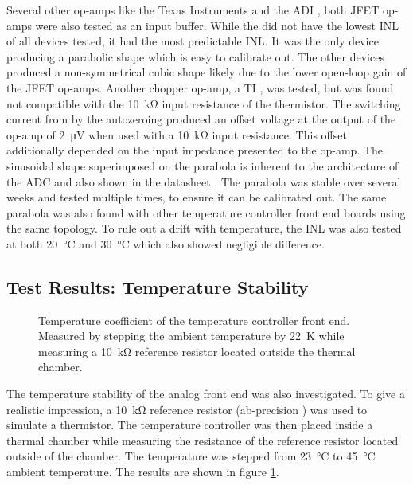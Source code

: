 Several other op-amps like the Texas Instruments  and the ADI , both JFET op-amps were also tested as an input buffer. While the  did not have the lowest INL of all devices tested, it had the most predictable INL. It was the only device producing a parabolic shape \cite{thesis_sattelmaier} which is easy to calibrate out. The other devices produced a non-symmetrical cubic shape likely due to the lower open-loop gain of the JFET op-amps. Another chopper op-amp, a TI , was tested, but was found not compatible with the \qty{10}{\kilo\ohm} input resistance of the thermistor. The switching current from by the autozeroing produced an offset voltage at the output of the op-amp of \qty{2}{\uV} when used with a \qty{10}{\kilo\ohm} input resistance. This offset additionally depended on the input impedance presented to the op-amp. The sinusoidal shape superimposed on the parabola is inherent to the architecture of the ADC and also shown in the datasheet \cite{datasheet_LTC2508-32}. The parabola was stable over several weeks and tested multiple times, to ensure it can be calibrated out. The same parabola was also found with other temperature controller front end boards using the same topology. To rule out a drift with temperature, the INL was also tested at both \qty{20}{\celsius} and \qty{30}{\celsius} which also showed negligible difference.

\subsection{Test Results: Temperature Stability}
\begin{figure}[htb]
    \centering
    
    \caption{Temperature coefficient of the temperature controller front end. Measured by stepping the ambient temperature by \qty{22}{\K} while measuring a \qty{10}{\kilo\ohm} reference resistor located outside the thermal chamber.}
    \label{fig:dgTemp_tempco}
\end{figure}

The temperature stability of the analog front end was also investigated. To give a realistic impression, a \qty{10}{\kilo \ohm} reference resistor (ab-precision ) was used to simulate a thermistor. The temperature controller was then placed inside a thermal chamber while measuring the resistance of the reference resistor located outside of the chamber. The temperature was stepped from \qty{23}{\celsius} to \qty{45}{\celsius} ambient temperature. The results are shown in figure \ref{fig:dgTemp_tempco}.

